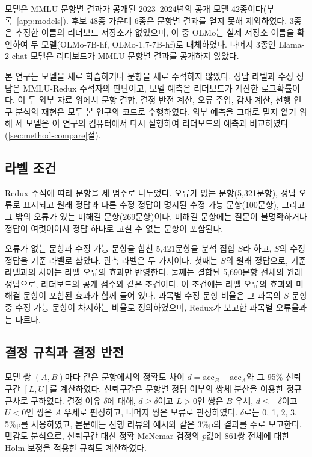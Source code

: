 \documentclass[11pt]{article}
\newcommand{\pp}{\%p}
\begin{document}
모델은 MMLU 문항별 결과가 공개된 2023--2024년의 공개 모델 42종이다(부록~\ref{app:models}). 후보 48종 가운데 6종은 문항별 결과를 얻지 못해 제외하였다. 3종은 추정한 이름의 리더보드 저장소가 없었으며, 이 중 OLMo는 실제 저장소 이름을 확인하여 두 모델(OLMo-7B-hf, OLMo-1.7-7B-hf)로 대체하였다. 나머지 3종인 Llama-2 chat 모델은 리더보드가 MMLU 문항별 결과를 공개하지 않았다.

본 연구는 모델을 새로 학습하거나 문항을 새로 주석하지 않았다. 정답 라벨과 수정 정답은 MMLU-Redux 주석자의 판단이고, 모델 예측은 리더보드가 계산한 로그확률이다. 이 두 외부 자료 위에서 문항 결합, 결정 반전 계산, 오류 주입, 감사 계산, 선행 연구 분석의 재현은 모두 본 연구의 코드로 수행하였다. 외부 예측을 그대로 믿지 않기 위해 세 모델은 이 연구의 컴퓨터에서 다시 실행하여 리더보드의 예측과 비교하였다(\ref{sec:method-compare}절).

\subsection{라벨 조건}
Redux 주석에 따라 문항을 세 범주로 나누었다. 오류가 없는 문항(5,321문항), 정답 오류로 표시되고 원래 정답과 다른 수정 정답이 명시된 수정 가능 문항(100문항), 그리고 그 밖의 오류가 있는 미해결 문항(269문항)이다. 미해결 문항에는 질문이 불명확하거나 정답이 여럿이어서 정답 하나로 고칠 수 없는 문항이 포함된다.

오류가 없는 문항과 수정 가능 문항을 합친 5,421문항을 분석 집합 $S$라 하고, $S$의 수정 정답을 기준 라벨로 삼았다. 관측 라벨은 두 가지이다. 첫째는 $S$의 원래 정답으로, 기준 라벨과의 차이는 라벨 오류의 효과만 반영한다. 둘째는 결합된 5,690문항 전체의 원래 정답으로, 리더보드의 공개 점수와 같은 조건이다. 이 조건에는 라벨 오류의 효과와 미해결 문항이 포함된 효과가 함께 들어 있다. 과목별 수정 문항 비율은 그 과목의 $S$ 문항 중 수정 가능 문항이 차지하는 비율로 정의하였으며, Redux가 보고한 과목별 오류율과는 다르다.

\subsection{결정 규칙과 결정 반전}
모델 쌍 $(A, B)$마다 같은 문항에서의 정확도 차이 $d = \mathrm{acc}_B - \mathrm{acc}_A$와 그 95\% 신뢰구간 $[L, U]$를 계산하였다. 신뢰구간은 문항별 정답 여부의 쌍체 분산을 이용한 정규근사로 구하였다. 결정 여유 $\delta$에 대해, $d \ge \delta$이고 $L > 0$인 쌍은 $B$ 우세, $d \le -\delta$이고 $U < 0$인 쌍은 $A$ 우세로 판정하고, 나머지 쌍은 보류로 판정하였다.
$\delta$로는 0, 1, 2, 3, 5\pp{}를 사용하였고, 본문에는 선행 리뷰의 예시와 같은 3\pp{}의 결과를 주로 보고한다. 민감도 분석으로, 신뢰구간 대신 정확 McNemar 검정\citep{mcnemar1947note}의 $p$값에 861쌍 전체에 대한 Holm 보정\citep{holm1979simple}을 적용한 규칙도 계산하였다.
\end{document}
